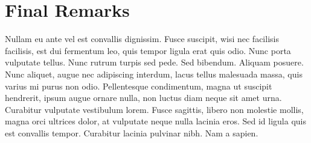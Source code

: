 \documentclass[conference]{IEEEtran}
\begin{document}
\section{Final Remarks}

Nullam eu ante vel est convallis dignissim. Fusce suscipit, wisi nec facilisis
facilisis, est dui fermentum leo, quis tempor ligula erat quis odio. Nunc porta
vulputate tellus. Nunc rutrum turpis sed pede. Sed bibendum. Aliquam posuere.
Nunc aliquet, augue nec adipiscing interdum, lacus tellus malesuada massa, quis
varius mi purus non odio. Pellentesque condimentum, magna ut suscipit hendrerit,
ipsum augue ornare nulla, non luctus diam neque sit amet urna. Curabitur
vulputate vestibulum lorem. Fusce sagittis, libero non molestie mollis, magna
orci ultrices dolor, at vulputate neque nulla lacinia eros. Sed id ligula quis
est convallis tempor. Curabitur lacinia pulvinar nibh. Nam a sapien.



\end{document}
